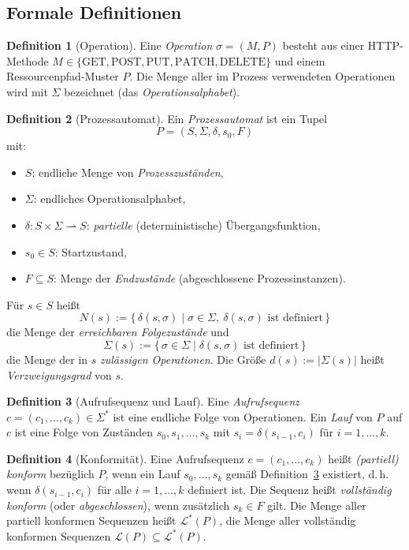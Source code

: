 ﻿\documentclass[a4paper,12pt]{article}
\theoremstyle{definition}
\newtheorem{definition}{Definition}
\begin{document}
\subsection{Formale Definitionen}

\begin{definition}[Operation]
	Eine \emph{Operation} $\sigma = (M, P)$ besteht aus einer HTTP-Methode
	$M \in \{\text{GET}, \text{POST}, \text{PUT}, \text{PATCH}, \text{DELETE}\}$ und einem
	Ressourcenpfad-Muster $P$. Die Menge aller im Prozess verwendeten Operationen wird mit
	$\Sigma$ bezeichnet (das \emph{Operationsalphabet}).
\end{definition}

\begin{definition}[Prozessautomat]
	\label{def:prozessautomat}
	Ein \emph{Prozessautomat} ist ein Tupel
	\[
		P = (S, \Sigma, \delta, s_0, F)
	\]
	mit:
	\begin{itemize}
		\item $S$: endliche Menge von \emph{Prozesszuständen},
		\item $\Sigma$: endliches Operationsalphabet,
		\item $\delta: S \times \Sigma \rightharpoonup S$: \emph{partielle} (deterministische)
		      Übergangsfunktion,
		\item $s_0 \in S$: Startzustand,
		\item $F \subseteq S$: Menge der \emph{Endzustände} (abgeschlossene Prozessinstanzen).
	\end{itemize}
	Für $s \in S$ heißt
	\[
		N(s) := \{\, \delta(s,\sigma) \mid \sigma \in \Sigma,\ \delta(s,\sigma) \text{ ist definiert} \,\}
	\]
	die Menge der \emph{erreichbaren Folgezustände} und
	\[
		\Sigma(s) := \{\, \sigma \in \Sigma \mid \delta(s,\sigma) \text{ ist definiert} \,\}
	\]
	die Menge der in $s$ \emph{zulässigen Operationen}. Die Größe $d(s) := |\Sigma(s)|$
	heißt \emph{Verzweigungsgrad} von $s$.
\end{definition}

\begin{definition}[Aufrufsequenz und Lauf]
	\label{def:lauf}
	Eine \emph{Aufrufsequenz} $c = (c_1, \ldots, c_k) \in \Sigma^*$ ist eine endliche Folge
	von Operationen. Ein \emph{Lauf} von $P$ auf $c$ ist eine Folge von Zuständen
	$s_0, s_1, \ldots, s_k$ mit $s_i = \delta(s_{i-1}, c_i)$ für $i = 1, \ldots, k$.
\end{definition}

\begin{definition}[Konformität]
	\label{def:konformitaet}
	Eine Aufrufsequenz $c = (c_1, \ldots, c_k)$ heißt \emph{(partiell) konform} bezüglich
	$P$, wenn ein Lauf $s_0, \ldots, s_k$ gemäß Definition~\ref{def:lauf} existiert, d.\,h.
	wenn $\delta(s_{i-1}, c_i)$ für alle $i = 1, \ldots, k$ definiert ist. Die Sequenz heißt
	\emph{vollständig konform} (oder \emph{abgeschlossen}), wenn zusätzlich $s_k \in F$ gilt.
	Die Menge aller partiell konformen Sequenzen heißt $\mathcal{L}^*(P)$, die Menge aller
	vollständig konformen Sequenzen $\mathcal{L}(P) \subseteq \mathcal{L}^*(P)$.
\end{definition}
\end{document}
